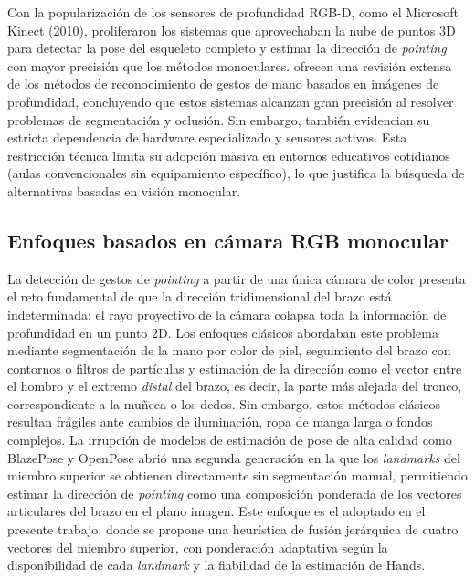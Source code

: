 \documentclass[12pt]{report} %
\begin{document}
Con la popularización de los sensores de profundidad RGB-D, como el Microsoft Kinect (2010), proliferaron los sistemas que aprovechaban la nube de puntos 3D para detectar la pose del esqueleto completo y estimar la dirección de \textit{pointing} con mayor precisión que los métodos monoculares. \citet{suarez2012hand} ofrecen una revisión extensa de los métodos de reconocimiento de gestos de mano basados en imágenes de profundidad, concluyendo que estos sistemas alcanzan gran precisión al resolver problemas de segmentación y oclusión. Sin embargo, también evidencian su estricta dependencia de hardware especializado y sensores activos. Esta restricción técnica limita su adopción masiva en entornos educativos cotidianos (aulas convencionales sin equipamiento específico), lo que justifica la búsqueda de alternativas basadas en visión monocular.

\subsection{Enfoques basados en cámara RGB monocular}

La detección de gestos de \textit{pointing} a partir de una única cámara de color presenta el reto fundamental de que la dirección tridimensional del brazo está indeterminada: el rayo proyectivo de la cámara colapsa toda la información de profundidad en un punto 2D. Los enfoques clásicos abordaban este problema mediante segmentación de la mano por color de piel, seguimiento del brazo con contornos o filtros de partículas y estimación de la dirección como el vector entre el hombro y el extremo \textit{distal} del brazo, es decir, la parte más alejada del tronco, correspondiente a la muñeca o los dedos. Sin embargo, estos métodos clásicos resultan frágiles ante cambios de iluminación, ropa de manga larga o fondos complejos. La irrupción de modelos de estimación de pose de alta calidad como BlazePose \citep{bazarevsky2020blazepose} y OpenPose \citep{cao2017realtime} abrió una segunda generación en la que los \textit{landmarks} del miembro superior se obtienen directamente sin segmentación manual, permitiendo estimar la dirección de \textit{pointing} como una composición ponderada de los vectores articulares del brazo en el plano imagen. Este enfoque es el adoptado en el presente trabajo, donde se propone una heurística de fusión jerárquica de cuatro vectores del miembro superior, con ponderación adaptativa según la disponibilidad de cada \textit{landmark} y la fiabilidad de la estimación de Hands.
\end{document}
